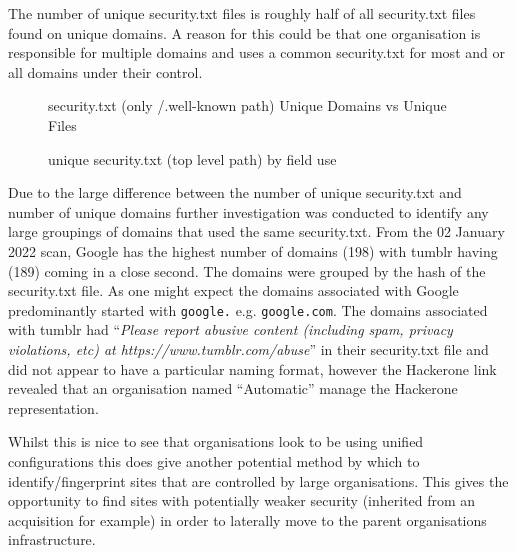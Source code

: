 \documentclass{mscreport}
\begin{document}
\vspace{0.3cm} \noindent
The number of unique security.txt files is roughly half of all security.txt files found on unique domains. A reason for this could be that one organisation is responsible for multiple domains and uses a common security.txt for most and or all domains under their control.

\newpage

\begin{figure}[t]
	\begin{center}
		\caption{security.txt (only /.well-known path) Unique Domains vs Unique Files}
		\label{fig:security_txt_unique_vs_domains}
	\end{center}
\end{figure}


\begin{figure}[t]
	\begin{center}
		\caption{unique security.txt (top level path) by field use}
		\label{fig:security_txt_by_fields_root_only}
	\end{center}
\end{figure}


\vspace{0.3cm} \noindent
Due to the large difference between the number of unique security.txt and number of unique domains further investigation was conducted to identify any large groupings of domains that used the same security.txt. From the 02 January 2022 scan, Google has the highest number of domains (198) with tumblr having (189) coming in a close second. The domains were grouped by the hash of the security.txt file. As one might expect the domains associated with Google predominantly started with \texttt{google.} e.g. \texttt{google.com}. The domains associated with tumblr had ``\textit{Please report abusive content (including spam, privacy violations, etc) at https://www.tumblr.com/abuse}'' in their security.txt file and did not appear to have a particular naming format, however the Hackerone link revealed that an organisation named ``Automatic'' manage the Hackerone representation.

\vspace{0.3cm} \noindent
Whilst this is nice to see that organisations look to be using unified configurations this does give another potential method by which to identify/fingerprint sites that are controlled by large organisations. This gives the opportunity to find sites with potentially weaker security (inherited from an acquisition for example) in order to laterally move to the parent organisations infrastructure.
\end{document}
